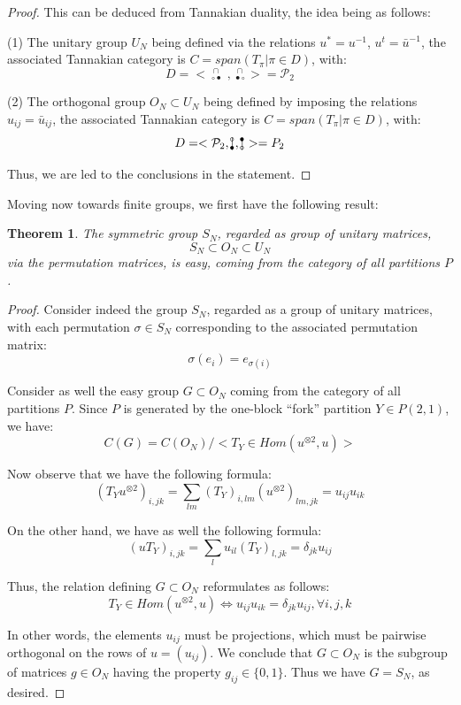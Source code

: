 \documentclass[12pt]{amsbook}
\newtheorem{theorem}{Theorem}[chapter]
\begin{document}
\begin{proof}
This can be deduced from Tannakian duality, the idea being as follows:

\medskip

(1) The unitary group $U_N$ being defined via the relations $u^*=u^{-1}$, $u^t=\bar{u}^{-1}$, the associated Tannakian category is $C=span(T_\pi|\pi\in D)$, with:
$$D
=<{\ }^{\,\cap}_{\circ\bullet}\,\,,{\ }^{\,\cap}_{\bullet\circ}>
=\mathcal P_2$$

(2) The orthogonal group $O_N\subset U_N$ being defined by imposing the relations $u_{ij}=\bar{u}_{ij}$, the associated Tannakian category is $C=span(T_\pi|\pi\in D)$, with:
$$D
=<\mathcal P_2,|^{\hskip-1.32mm\circ}_{\hskip-1.32mm\bullet},|_{\hskip-1.32mm\circ}^{\hskip-1.32mm\bullet}>
=P_2$$
  
Thus, we are led to the conclusions in the statement.
\end{proof}

Moving now towards finite groups, we first have the following result:

\begin{theorem}
The symmetric group $S_N$, regarded as group of unitary matrices,
$$S_N\subset O_N\subset U_N$$
via the permutation matrices, is easy, coming from the category of all partitions $P$.
\end{theorem}

\begin{proof}
Consider indeed the group $S_N$, regarded as a group of unitary matrices, with each permutation $\sigma\in S_N$ corresponding to the associated permutation matrix:
$$\sigma(e_i)=e_{\sigma(i)}$$

Consider as well the easy group $G\subset O_N$ coming from the category of all partitions $P$. Since $P$ is generated by the one-block ``fork'' partition $Y\in P(2,1)$, we have:
$$C(G)=C(O_N)\Big/\Big<T_Y\in Hom(u^{\otimes 2},u)\Big>$$

Now observe that we have the following formula:
$$(T_Yu^{\otimes 2})_{i,jk}
=\sum_{lm}(T_Y)_{i,lm}(u^{\otimes 2})_{lm,jk}
=u_{ij}u_{ik}$$

On the other hand, we have as well the following formula:
$$(uT_Y)_{i,jk}
=\sum_lu_{il}(T_Y)_{l,jk}
=\delta_{jk}u_{ij}$$

Thus, the relation defining $G\subset O_N$ reformulates as follows:
$$T_Y\in Hom(u^{\otimes 2},u)\iff u_{ij}u_{ik}=\delta_{jk}u_{ij},\forall i,j,k$$

In other words, the elements $u_{ij}$ must be projections, which must be pairwise orthogonal on the rows of $u=(u_{ij})$. We conclude that $G\subset O_N$ is the subgroup of matrices $g\in O_N$ having the property $g_{ij}\in\{0,1\}$. Thus we have $G=S_N$, as desired. 
\end{proof}
\end{document}
